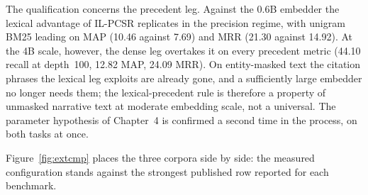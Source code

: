\documentclass{mnnit}
\begin{document}
The qualification concerns the precedent leg. Against the 0.6B
embedder the lexical advantage of IL-PCSR replicates in the
precision regime, with unigram BM25 leading on MAP (10.46
against 7.69) and MRR (21.30 against 14.92). At the 4B scale,
however, the dense leg overtakes it on every precedent metric
(44.10 recall at depth~100, 12.82 MAP, 24.09 MRR). On
entity-masked text the citation phrases the lexical leg
exploits are already gone, and a sufficiently large embedder no
longer needs them; the lexical-precedent rule is therefore a
property of unmasked narrative text at moderate embedding
scale, not a universal. The parameter hypothesis of Chapter~4
is confirmed a second time in the process, on both tasks at
once.

Figure~\ref{fig:extcmp} places the three corpora side by side:
the measured configuration stands against the strongest
published row reported for each benchmark.
\end{document}
